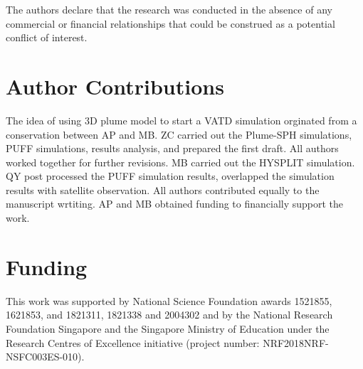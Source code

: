 \documentclass[utf8]{frontiersSCNS} %
\begin{document}
The authors declare that the research was conducted in the absence of any commercial or financial relationships that could be construed as a potential conflict of interest.

\section*{Author Contributions}
The idea of using 3D plume model to start a VATD simulation orginated from a conservation between AP and MB. ZC carried out the Plume-SPH simulations, PUFF simulations, results analysis, and prepared the first draft. All authors worked together for further revisions.  MB carried out the HYSPLIT simulation. QY post processed the PUFF simulation results, overlapped the simulation results with satellite observation. All authors contributed equally to the manuscript wrtiting. AP and MB obtained funding to financially support the work.

\section*{Funding}
This work was supported by National Science Foundation awards 1521855, 1621853, and 1821311, 1821338  and 2004302 and by the National Research Foundation Singapore and the Singapore Ministry of Education under the Research Centres of Excellence initiative (project number: NRF2018NRF-NSFC003ES-010). 


\end{document}
